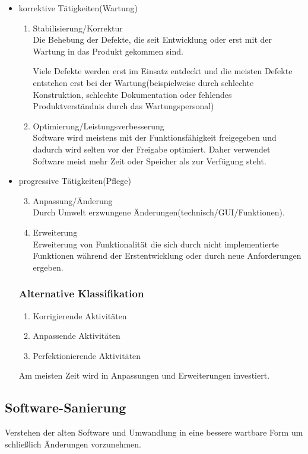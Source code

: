 \documentclass[a4paper]{article}
\theoremstyle{break}
\begin{document}
\begin{itemize}
\item korrektive Tätigkeiten(Wartung)
  \begin{enumerate}
  \item Stabilisierung/Korrektur\\
    Die Behebung der Defekte, die seit Entwicklung oder erst mit der Wartung in das Produkt gekommen sind.

    Viele Defekte werden erst im Einsatz entdeckt und die meisten Defekte entstehen erst bei der Wartung(beispielweise durch schlechte Konstruktion, schlechte Dokumentation oder fehlendes Produktverständnis durch das Wartungspersonal)
  \item Optimierung/Leistungsverbesserung\\
    Software wird meistens mit der Funktionsfähigkeit freigegeben und dadurch wird selten vor der Freigabe optimiert. Daher verwendet Software meist mehr Zeit oder Speicher als zur Verfügung steht.

  \end{enumerate}
\item progressive Tätigkeiten(Pflege)
  \begin{enumerate}
    \setcounter{enumi}{2}
  \item Anpassung/Änderung\\
    Durch Umwelt erzwungene Änderungen(technisch/GUI/Funktionen).
  \item Erweiterung\\
    Erweiterung von Funktionalität die sich durch nicht implementierte Funktionen während der Erstentwicklung oder durch neue Anforderungen ergeben.
  \end{enumerate}

  \subsubsection{Alternative Klassifikation}
  \begin{enumerate}
  \item Korrigierende Aktivitäten
  \item Anpassende Aktivitäten
  \item Perfektionierende Aktivitäten
  \end{enumerate}
  \noindent Am meisten Zeit wird in Anpassungen und Erweiterungen investiert.
\end{itemize}

\subsection{Software-Sanierung}
Verstehen der alten Software und Umwandlung in eine bessere wartbare Form um schlie\ss{}lich Änderungen vorzunehmen.
\end{document}
